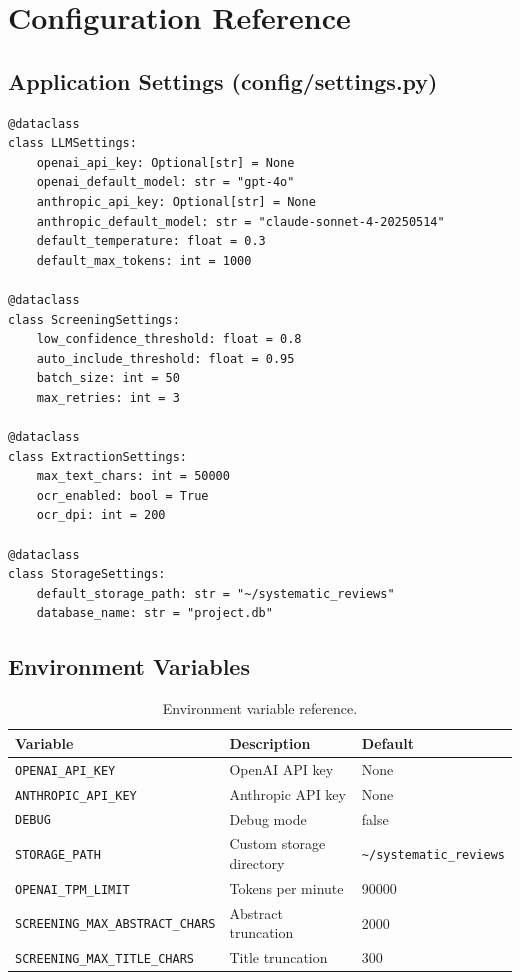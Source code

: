 \documentclass[11pt,a4paper]{article}
\begin{document}
\section{Configuration Reference}

\subsection{Application Settings (config/settings.py)}

\begin{lstlisting}[style=python, title=Default Configuration]
@dataclass
class LLMSettings:
    openai_api_key: Optional[str] = None
    openai_default_model: str = "gpt-4o"
    anthropic_api_key: Optional[str] = None
    anthropic_default_model: str = "claude-sonnet-4-20250514"
    default_temperature: float = 0.3
    default_max_tokens: int = 1000

@dataclass
class ScreeningSettings:
    low_confidence_threshold: float = 0.8
    auto_include_threshold: float = 0.95
    batch_size: int = 50
    max_retries: int = 3

@dataclass
class ExtractionSettings:
    max_text_chars: int = 50000
    ocr_enabled: bool = True
    ocr_dpi: int = 200

@dataclass
class StorageSettings:
    default_storage_path: str = "~/systematic_reviews"
    database_name: str = "project.db"
\end{lstlisting}

\subsection{Environment Variables}

\begin{table}[H]
\centering\small
\begin{tabular}{lp{6cm}l}
\toprule
\textbf{Variable} & \textbf{Description} & \textbf{Default} \\
\midrule
\texttt{OPENAI\_API\_KEY} & OpenAI API key & None \\
\texttt{ANTHROPIC\_API\_KEY} & Anthropic API key & None \\
\texttt{DEBUG} & Debug mode & false \\
\texttt{STORAGE\_PATH} & Custom storage directory & \texttt{\textasciitilde/systematic\_reviews} \\
\texttt{OPENAI\_TPM\_LIMIT} & Tokens per minute & 90000 \\
\texttt{SCREENING\_MAX\_ABSTRACT\_CHARS} & Abstract truncation & 2000 \\
\texttt{SCREENING\_MAX\_TITLE\_CHARS} & Title truncation & 300 \\
\bottomrule
\end{tabular}
\caption{Environment variable reference.}
\end{table}
\end{document}
